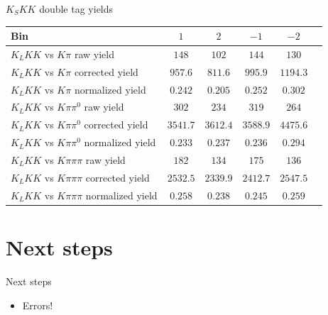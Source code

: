 \documentclass{beamer}
\begin{document}
\begin{frame}{$K_SKK$ double tag yields}
  \centering
  \def\arraystretch{1.2}%
  \begin{tabular}{l|ccccc}
    Bin                                        & $1$      & $2$      & $-1$     & $-2$ \\
    \hline
    $K_LKK$ vs $K\pi$ raw yield                & $148$    & $102$    & $144$    & $130$ \\
    $K_LKK$ vs $K\pi$ corrected yield          & $957.6$  & $811.6$  & $995.9$  & $1194.3$ \\
    $K_LKK$ vs $K\pi$ normalized yield         & $0.242$  & $0.205$  & $0.252$  & $0.302$ \\
    \hline
    $K_LKK$ vs $K\pi\pi^0$ raw yield           & $302$    & $234$    & $319$    & $264$ \\
    $K_LKK$ vs $K\pi\pi^0$ corrected yield     & $3541.7$ & $3612.4$ & $3588.9$ & $4475.6$ \\
    $K_LKK$ vs $K\pi\pi^0$ normalized yield    & $0.233$  & $0.237$  & $0.236$  & $0.294$ \\
    \hline
    $K_LKK$ vs $K\pi\pi\pi$ raw yield          & $182$    & $134$    & $175$    & $136$ \\
    $K_LKK$ vs $K\pi\pi\pi$ corrected yield    & $2532.5$ & $2339.9$ & $2412.7$ & $2547.5$ \\
    $K_LKK$ vs $K\pi\pi\pi$ normalized yield   & $0.258$  & $0.238$  & $0.245$  & $0.259$ \\
    \hline
  \end{tabular}
\end{frame}

\section{Next steps}
\begin{frame}{Next steps}
  \begin{itemize}
    \setlength\itemsep{2em}
    \item{Errors!}
  \end{itemize}
\end{frame}
\end{document}
